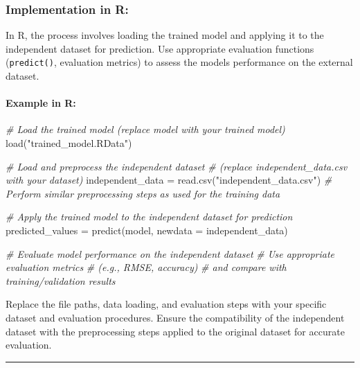 \documentclass[
]{article}
\newenvironment{Shaded}{}{}
\newcommand{\AttributeTok}[1]{\textcolor[rgb]{0.49,0.56,0.16}{#1}}
\newcommand{\CommentTok}[1]{\textcolor[rgb]{0.38,0.63,0.69}{\textit{#1}}}
\newcommand{\FunctionTok}[1]{\textcolor[rgb]{0.02,0.16,0.49}{#1}}
\newcommand{\NormalTok}[1]{#1}
\newcommand{\OtherTok}[1]{\textcolor[rgb]{0.00,0.44,0.13}{#1}}
\newcommand{\StringTok}[1]{\textcolor[rgb]{0.25,0.44,0.63}{#1}}
\begin{document}
\hypertarget{implementation-in-r-2}{%
\subsubsection{Implementation in R:}\label{implementation-in-r-2}}

In R, the process involves loading the trained model and applying it to
the independent dataset for prediction. Use appropriate evaluation
functions (\texttt{predict()}, evaluation metrics) to assess the
model\textquotesingle s performance on the external dataset.

\hypertarget{example-in-r}{%
\paragraph{Example in R:}\label{example-in-r}}

\begin{Shaded}
\begin{Highlighting}[]
\CommentTok{\# Load the trained model (replace \textquotesingle{}model\textquotesingle{} with your trained model)}
\FunctionTok{load}\NormalTok{(}\StringTok{"trained\_model.RData"}\NormalTok{)}

\CommentTok{\# Load and preprocess the independent dataset }
\CommentTok{\# (replace \textquotesingle{}independent\_data.csv\textquotesingle{} with your dataset)}
\NormalTok{independent\_data }\OtherTok{=} \FunctionTok{read.csv}\NormalTok{(}\StringTok{"independent\_data.csv"}\NormalTok{)}
\CommentTok{\# Perform similar preprocessing steps as used for the training data}

\CommentTok{\# Apply the trained model to the independent dataset for prediction}
\NormalTok{predicted\_values }\OtherTok{=} \FunctionTok{predict}\NormalTok{(model, }\AttributeTok{newdata =}\NormalTok{ independent\_data)}

\CommentTok{\# Evaluate model performance on the independent dataset}
\CommentTok{\# Use appropriate evaluation metrics }
\CommentTok{\# (e.g., RMSE, accuracy) }
\CommentTok{\# and compare with training/validation results}
\end{Highlighting}
\end{Shaded}

Replace the file paths, data loading, and evaluation steps with your
specific dataset and evaluation procedures. Ensure the compatibility of
the independent dataset with the preprocessing steps applied to the
original dataset for accurate evaluation.

\begin{center}\rule{0.5\linewidth}{0.5pt}\end{center}
\end{document}
